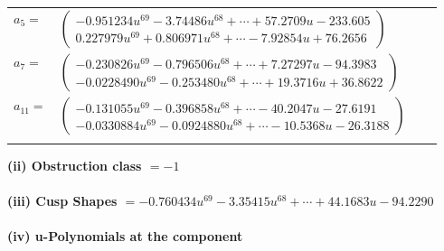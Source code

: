 \documentclass[1p]{elsarticle_modified}
\theoremstyle{definition}
\begin{document}
\begin{tabular}{m{7pt} m{180pt} m{7pt} m{180pt} }
\flushright $a_{5}=$&$\begin{pmatrix}-0.951234 u^{69}-3.74486 u^{68}+\cdots+57.2709 u-233.605\\0.227979 u^{69}+0.806971 u^{68}+\cdots-7.92854 u+76.2656\end{pmatrix}$ \\
\flushright $a_{7}=$&$\begin{pmatrix}-0.230826 u^{69}-0.796506 u^{68}+\cdots+7.27297 u-94.3983\\-0.0228490 u^{69}-0.253480 u^{68}+\cdots+19.3716 u+36.8622\end{pmatrix}$ \\
\flushright $a_{11}=$&$\begin{pmatrix}-0.131055 u^{69}-0.396858 u^{68}+\cdots-40.2047 u-27.6191\\-0.0330884 u^{69}-0.0924880 u^{68}+\cdots-10.5368 u-26.3188\end{pmatrix}$\\&\end{tabular}
\flushleft \textbf{(ii) Obstruction class $= -1$}\\~\\
\flushleft \textbf{(iii) Cusp Shapes $= -0.760434 u^{69}-3.35415 u^{68}+\cdots+44.1683 u-94.2290$}\\~\\
\newpage\renewcommand{\arraystretch}{1}
\flushleft \textbf{(iv) u-Polynomials at the component}\newline \\
\end{document}
